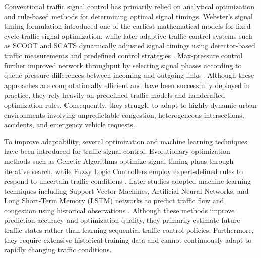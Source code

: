 \documentclass[3p,times]{elsarticle}
\theoremstyle{plain}
\theoremstyle{definition}
\begin{document}
Conventional traffic signal control has primarily relied on analytical
optimization and rule-based methods for determining optimal signal
timings. Webster's signal timing formulation introduced one of the
earliest mathematical models for fixed-cycle traffic signal
optimization, while later adaptive traffic control systems such as
SCOOT and SCATS dynamically adjusted signal timings using detector-based
traffic measurements and predefined control strategies
\cite{webster1958,scoot,scats,opac}. Max-pressure control further
improved network throughput by selecting signal phases according to
queue pressure differences between incoming and outgoing links
\cite{maxpressure}. Although these approaches are computationally
efficient and have been successfully deployed in practice, they rely
heavily on predefined traffic models and handcrafted optimization
rules. Consequently, they struggle to adapt to highly dynamic urban
environments involving unpredictable congestion, heterogeneous
intersections, accidents, and emergency vehicle requests.

To improve adaptability, several optimization and machine learning
techniques have been introduced for traffic signal control.
Evolutionary optimization methods such as Genetic Algorithms optimize
signal timing plans through iterative search, while Fuzzy Logic
Controllers employ expert-defined rules to respond to uncertain
traffic conditions \cite{genetic,fuzzy}. Later studies adopted machine
learning techniques including Support Vector Machines, Artificial
Neural Networks, and Long Short-Term Memory (LSTM) networks to predict
traffic flow and congestion using historical observations
\cite{anntraffic,svmtraffic,lstmtraffic}. Although these methods
improve prediction accuracy and optimization quality, they primarily
estimate future traffic states rather than learning sequential traffic
control policies. Furthermore, they require extensive historical
training data and cannot continuously adapt to rapidly changing
traffic conditions.
\end{document}
